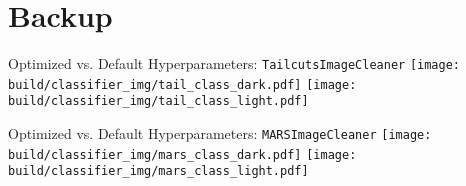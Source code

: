 



\section*{Backup}%
\label{sub:Backup}

\begin{frame}{Optimized vs. Default Hyperparameters: \texttt{TailcutsImageCleaner}}
    {%
    \centering
    \texttt{[image: build/classifier\_img/tail\_class\_dark.pdf]}
    }
    {%
    \centering
    \texttt{[image: build/classifier\_img/tail\_class\_light.pdf]}
    }
\end{frame}

\begin{frame}{Optimized vs. Default Hyperparameters: \texttt{MARSImageCleaner}}
    {%
    \centering
    \texttt{[image: build/classifier\_img/mars\_class\_dark.pdf]}
    }
    {%
    \centering
    \texttt{[image: build/classifier\_img/mars\_class\_light.pdf]}
    }
\end{frame}

